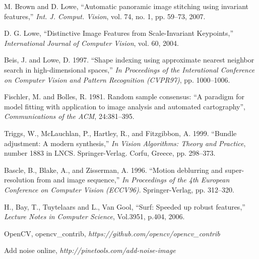 \documentclass[10pt,twocolumn,letterpaper]{article}
\begin{document}
\begin{thebibliography}{9}
M. Brown and D. Lowe, ``Automatic panoramic image stitching using invariant features,''
\textit{Int. J. Comput. Vision}, vol. 74, no. 1, pp. 59–73, 2007.

D. G. Lowe, ``Distinctive Image Features from Scale-Invariant Keypoints,''
\textit{International Journal of Computer Vision}, vol. 60, 2004.

Beis, J. and Lowe, D. 1997. ``Shape indexing using approximate nearest neighbor search in high-dimensional spaces,''
\textit{In Proceedings of the Interational Conference on Computer Vision and Pattern Recognition (CVPR97)}, pp. 1000–1006.

Fischler, M. and Bolles, R. 1981. Random sample consensus: ``A paradigm for model fitting with application to image analysis and automated cartography'',
\textit{Communications of the ACM}, 24:381–395.

Triggs, W., McLauchlan, P., Hartley, R., and Fitzgibbon, A. 1999. ``Bundle adjustment: A modern synthesis,''
\textit{In Vision Algorithms: Theory and Practice}, number 1883 in LNCS. Springer-Verlag. Corfu, Greece, pp. 298–373.

Bascle, B., Blake, A., and Zisserman, A. 1996. ``Motion deblurring and super-resolution from and image sequence,''
\textit{In Proceedings of the 4th European Conference on Computer Vision (ECCV96)}. Springer-Verlag, pp. 312–320.

H., Bay, T., Tuytelaars and L., Van Gool, ``Surf: Speeded up robust features,''
\textit{Lecture Notes in Computer Science}, Vol.3951, p.404, 2006.

OpenCV, opencv\_contrib,
\textit{https://github.com/opencv/opencv\_contrib}

Add noise online,
\textit{http://pinetools.com/add-noise-image}

\end{thebibliography}
\end{document}
